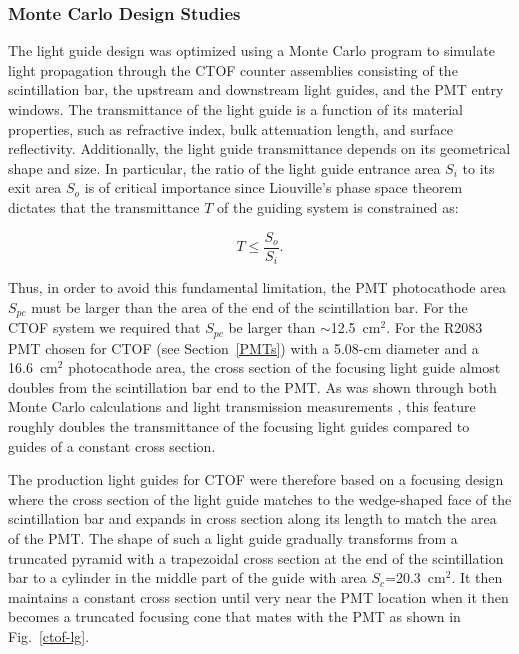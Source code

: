 \documentclass{elsart}
\begin{document}
\subsubsection{Monte Carlo Design Studies}
\label{lg-mc}

The light guide design was optimized using a Monte Carlo program to simulate light propagation
through the CTOF counter assemblies consisting of the scintillation bar, the upstream and
downstream light guides, and the PMT entry windows. The transmittance of the light guide is a
function of its material properties, such as refractive index, bulk attenuation length, and
surface reflectivity. Additionally, the light guide transmittance depends on its geometrical
shape and size. In particular, the ratio of the light guide entrance area $S_i$ to its exit
area $S_o$ is of critical importance since Liouville's phase space theorem dictates that the 
transmittance $T$ of the guiding system is constrained as:

\begin{equation}
T \le \frac{S_o}{S_i}.
\end{equation}

\noindent
Thus, in order to avoid this fundamental limitation, the PMT photocathode area $S_{pc}$ must
be larger than the area of the end of the scintillation bar. For the CTOF system we required
that $S_{pc}$ be larger than $\sim$12.5~cm$^2$. For the R2083 PMT chosen for CTOF (see
Section~\ref{PMTs}) with a 5.08-cm diameter and a 16.6~cm$^2$ photocathode area, the cross
section of the focusing light guide almost doubles from the scintillation bar end to the PMT. As
was shown through both Monte Carlo calculations and light transmission measurements
\cite{barbosa06}, this feature roughly doubles the transmittance of the focusing light guides
compared to guides of a constant cross section.

The production light guides for CTOF were therefore based on a focusing design where 
the cross section of the light guide matches to the wedge-shaped face of the scintillation bar 
and expands in cross section along its length to match the area of the PMT. The shape of such a 
light guide gradually transforms from a truncated pyramid with a trapezoidal cross section at 
the end of the scintillation bar to a cylinder in the middle part of the guide with area 
$S_c$=20.3~cm$^2$. It then maintains a constant cross section until very near the PMT location 
when it then becomes a truncated focusing cone that mates with the PMT as shown in
Fig.~\ref{ctof-lg}.
\end{document}
